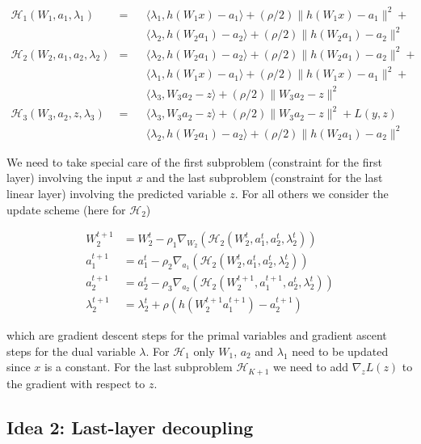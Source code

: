 \documentclass[english,11pt,a4paper]{article}
\newcommand\inner[2]{\langle #1, #2 \rangle}
\begin{document}
\begin{equation}
	\begin{aligned}
		\mathcal{H}_1(W_1,a_1,\lambda_1) &= && \inner{\lambda_1}{h(W_1x)-a_1} + (\rho/2) \| h(W_1x)-a_1 \|^2 + \\
			& && \inner{\lambda_2}{h(W_2a_1)-a_2} + (\rho/2) \| h(W_2a_1)-a_2 \|^2 \\
		\mathcal{H}_2(W_2,a_1,a_2,\lambda_2) &= && \inner{\lambda_2}{h(W_2a_1)-a_2} + (\rho/2) \| h(W_2a_1)-a_2 \|^2 + \\
			& && \inner{\lambda_1}{h(W_1x)-a_1} + (\rho/2) \| h(W_1x)-a_1 \|^2 + \\
			& && \inner{\lambda_3}{W_3a_2-z} + (\rho/2) \| W_3a_2-z \|^2 \\
		\mathcal{H}_3(W_3,a_2,z,\lambda_3) &= && \inner{\lambda_3}{W_3a_2-z} + (\rho/2) \| W_3a_2-z \|^2 + L(y,z) \\
			& && \inner{\lambda_2}{h(W_2a_1)-a_2} + (\rho/2) \| h(W_2a_1)-a_2 \|^2 
	\end{aligned}
\end{equation}

We need to take special care of the first subproblem (constraint for the first layer) involving the input $x$ and the last subproblem (constraint for the last linear layer) involving the predicted variable $z$. For all others we consider the update scheme (here for $\mathcal{H}_2$)

\begin{equation}
	\begin{aligned}
		W_2^{t+1} &= W_2^t - \rho_1 \nabla_{W_2}(\mathcal{H}_2(W_2^t,a_1^t,a_2^t,\lambda_2^t)) \\
		a_1^{t+1} &= a_1^t - \rho_2 \nabla_{a_1}(\mathcal{H}_2(W_2^t,a_1^t,a_2^t,\lambda_2^t)) \\
		a_2^{t+1} &= a_2^t - \rho_3 \nabla_{a_2}(\mathcal{H}_2(W_2^{t+1},a_1^{t+1},a_2^t,\lambda_2^t)) \\
		\lambda_2^{t+1} &= \lambda_2^{t} + \rho (h(W_2^{t+1}a_1^{t+1})-a_2^{t+1})
	\end{aligned}
\end{equation}

which are gradient descent steps for the primal variables and gradient ascent steps for the dual variable $\lambda$. For $\mathcal{H}_1$ only $W_1$, $a_2$ and $\lambda_1$ need to be updated since $x$ is a constant. For the last subproblem $\mathcal{H}_{K+1}$ we need to add $\nabla_zL(z)$ to the gradient with respect to $z$.

\subsection{Idea 2: Last-layer decoupling}
\end{document}
